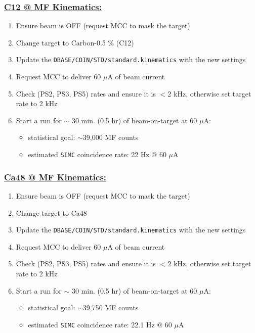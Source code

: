\documentclass{article}
\begin{document}
\subsubsection*{\underline{C12 @ MF Kinematics:}}
\begin{enumerate}
\item Ensure beam is OFF (request MCC to mask the target)
\item Change target to Carbon-0.5 \% (C12)
\item Update the \texttt{DBASE/COIN/STD/standard.kinematics} with the new settings
\item Request MCC to deliver 60 $\mu$A of beam current
\item Check (PS2, PS3, PS5) rates and ensure it is $<$2 kHz, otherwise set target rate to 2 kHz
\item Start a run for $\sim$ 30 min. (0.5 hr) of beam-on-target at 60 $\mu$A:
\begin{itemize}
    \item statistical goal: $\sim$39,000 MF counts
    \item estimated \texttt{SIMC} coincidence rate: 22 Hz @ 60 $\mu$A
\end{itemize}
\end{enumerate}

\subsubsection*{\underline{Ca48 @ MF Kinematics:}}
\begin{enumerate}
\item Ensure beam is OFF (request MCC to mask the target)
\item Change target to Ca48
\item Update the \texttt{DBASE/COIN/STD/standard.kinematics} with the new settings
\item Request MCC to deliver 60 $\mu$A of beam current
\item Check (PS2, PS3, PS5) rates and ensure it is $<$2 kHz, otherwise set target rate to 2 kHz
\item Start a run for $\sim$ 30 min. (0.5 hr) of beam-on-target at 60 $\mu$A:
\begin{itemize}
    \item statistical goal: $\sim$39,750 MF counts
    \item estimated \texttt{SIMC} coincidence rate: 22.1 Hz @ 60 $\mu$A
\end{itemize}
\end{enumerate}
\end{document}
